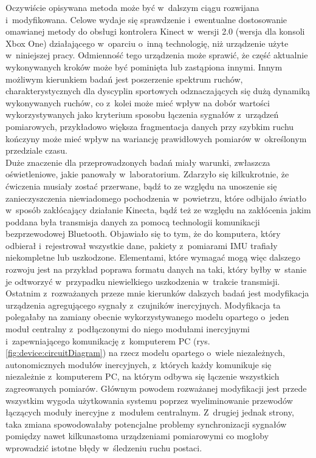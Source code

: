 Oczywiście opisywana metoda może być w~dalszym ciągu rozwijana i~modyfikowana. Celowe wydaje się sprawdzenie i~ewentualne dostosowanie omawianej metody do obsługi kontrolera Kinect w~wersji 2.0 (wersja dla konsoli Xbox One) działającego w~oparciu o~inną technologię, niż urządzenie użyte w~niniejszej pracy. Odmienność tego urządzenia może sprawić, że część aktualnie wykonywanych kroków może być pominięta lub zastąpiona innymi. Innym możliwym kierunkiem badań jest poszerzenie spektrum ruchów, charakterystycznych dla dyscyplin sportowych odznaczających się dużą dynamiką wykonywanych ruchów, co z~kolei może mieć wpływ na dobór wartości wykorzystywanych jako kryterium sposobu łączenia sygnałów z~urządzeń pomiarowych, przykładowo większa fragmentacja danych przy szybkim ruchu kończyny może mieć wpływ na wariancję prawidłowych pomiarów w~określonym przedziale czasu.\\
Duże znaczenie dla przeprowadzonych badań miały warunki, zwłaszcza oświetleniowe, jakie panowały w~laboratorium. Zdarzyło się kilkukrotnie, że ćwiczenia musiały zostać przerwane, bądź to ze względu na unoszenie się zanieczyszczenia niewiadomego pochodzenia w~powietrzu, które odbijało światło w~sposób zakłócający działanie Kinecta, bądź też ze względu na zakłócenia jakim poddana była transmisja danych za pomocą technologii  komunikacji bezprzewodowej Bluetooth. Objawiało się to tym, że do komputera, który odbierał i~rejestrował wszystkie dane, pakiety z~pomiarami IMU trafiały niekompletne lub uszkodzone. Elementami, które wymagać mogą więc dalszego rozwoju jest na przykład poprawa formatu danych na taki, który byłby w~stanie je odtworzyć w~przypadku niewielkiego uszkodzenia w~trakcie transmisji.\\
Ostatnim z~rozważanych przeze mnie kierunków dalszych badań jest modyfikacja urządzenia agregującego sygnały z~czujników inercyjnych. Modyfikacja ta polegałaby na zamiany obecnie wykorzystywanego modelu opartego o~jeden moduł centralny z~podłączonymi do niego modułami inercyjnymi i~zapewniającego komunikację z~komputerem PC (rys. \ref{fig:device:circuitDiagram}) na rzecz modelu opartego o~wiele niezależnych, autonomicznych modułów inercyjnych, z~których każdy komunikuje się niezależnie z~komputerem PC, na którym odbywa się łączenie wszystkich zagreowanych pomiarów. Głównym powodem rozważanej modyfikacji jest przede wszystkim wygoda użytkowania systemu poprzez wyeliminowanie przewodów łączących moduły inercyjne z~modułem centralnym. Z~drugiej jednak strony, taka zmiana spowodowałaby potencjalne problemy synchronizacji sygnałów pomiędzy nawet kilkunastoma urządzeniami pomiarowymi co mogłoby wprowadzić istotne błędy w~śledzeniu ruchu postaci.